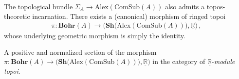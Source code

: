     The topological bundle $\Sigma_A\rightarrow\mathrm{Alex}(\mathrm{ComSub}(A))$ also admits a topos-theoretic incarnation. There exists a (canonical) morphism of ringed topoi
    \begin{gather}
        \pi:\mathbf{Bohr}(A)\rightarrow\bigl(\mathbf{Sh}\bigl(\mathrm{Alex}(\mathrm{ComSub}(A))\bigr),\underline{\mathbb{R}}\bigr)\,,
    \end{gather}
    whose underlying geometric morphism is simply the identity.

    \begin{property}[States]
        A positive and normalized section of the morphism $\pi:\mathbf{Bohr}(A)\rightarrow\bigl(\mathbf{Sh}\bigl(\mathrm{Alex}(\mathrm{ComSub}(A))\bigr),\underline{\mathbb{R}}\bigr)$ in the category of $\underline{\mathbb{R}}$-\textit{module topoi}.
    \end{property}